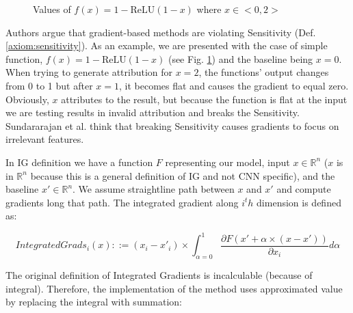 \begin{figure}
  \caption{Values of $f(x) = 1 - \text{ReLU}(1 - x)$ where $x \in <0,2>$}\label{fig:ig-relu-example}
\end{figure}

Authors argue that gradient-based methods are violating Sensitivity (Def. \ref{axiom:sensitivity}). As an example, we are presented with the case of simple function, $f(x) = 1 - \text{ReLU}(1 - x)$ (see Fig. \ref{fig:ig-relu-example}) and the baseline being $x = 0$. When trying to generate attribution for $x = 2$, the functions' output changes from 0 to 1 but after $x=1$, it becomes flat and causes the gradient to equal zero. Obviously, $x$ attributes to the result, but because the function is flat at the input we are testing results in invalid attribution and breaks the Sensitivity. Sundararajan et al. think that breaking Sensitivity causes gradients to focus on irrelevant features.

\vspace{\baselineskip}

In IG definition we have a function $F$ representing our model, input $x \in \mathbb{R}^{n}$ ($x$ is in $\mathbb{R}^n$ because this is a general definition of IG and not CNN specific), and the baseline $x' \in \mathbb{R}^{n}$. We assume straightline path between $x$ and $x'$ and compute gradients long that path. The integrated gradient along $i^th$ dimension is defined as:

\begin{equation}
    IntegratedGrads_{i}(x) ::= (x_{i} - x'_{i})\times\int_{\alpha=0}^1\frac{\partial F(x'+\alpha \times (x - x'))}{\partial x_i}{d\alpha}
    \label{eq:ig-full-eq}
\end{equation}

The original definition of Integrated Gradients is incalculable (because of integral). Therefore, the implementation of the method uses approximated value by replacing the integral with summation:

